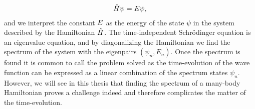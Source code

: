         \begin{align}
            \hat{H}\psi = E\psi,
        \end{align}
        and we interpret the constant $E$ as the energy of the state
        $\psi$ in the system described by the Hamiltonian $\hat{H}$.
        The time-independent Schrödinger equation is an eigenvalue equation, and
        by diagonalizing the Hamiltonian we find the spectrum of the system with
        the eigenpairs $(\psi_n, E_n)$.
        Once the spectrum is found it is common to call the problem solved as
        the time-evolution of the wave function can be expressed as a linear
        combination of the spectrum states $\psi_n$.
        However, we will see in this thesis that finding the spectrum of a
        many-body Hamiltonian proves a challenge indeed and therefore
        complicates the matter of the time-evolution.

